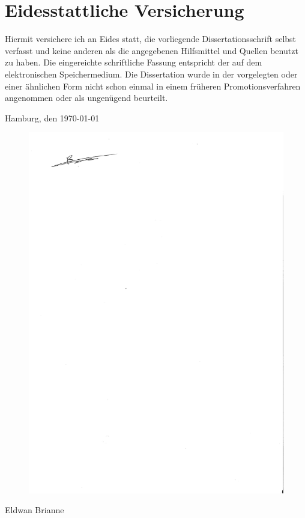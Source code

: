 \thispagestyle{empty}

\chapter*{Eidesstattliche Versicherung}
\vspace{2cm}

\noindent Hiermit versichere ich an Eides statt, die vorliegende Dissertationsschrift selbst verfasst und keine anderen als die angegebenen Hilfsmittel und Quellen benutzt zu haben.
Die eingereichte schriftliche Fassung entspricht der auf dem elektronischen Speichermedium.
Die Dissertation wurde in der vorgelegten oder einer \"ahnlichen Form nicht schon einmal in einem fr\"uheren Promotionsverfahren angenommen oder als ungen\"ugend beurteilt.

\vspace{1cm}

\noindent Hamburg, den \today
\begin{figure}[htbp!]
  \includegraphics[width=0.5\linewidth]{Signature.pdf}
\end{figure}

\noindent Eldwan Brianne

